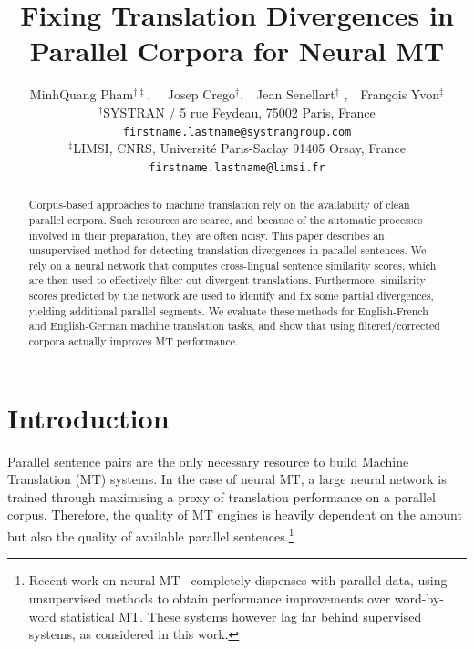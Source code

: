 \documentclass[11pt,a4paper]{article}
\title{Fixing Translation Divergences in Parallel Corpora for Neural MT}
\author{MinhQuang Pham$^{\dag\ddag}$, \ \ Josep Crego$^\dag$,\ \ Jean Senellart$^\dag$ ,\ \ Fran\c cois Yvon$^\ddag$\\
  $^\dag$SYSTRAN / 5 rue Feydeau, 75002 Paris, France\\
  {\tt firstname.lastname@systrangroup.com}\\
  $^\ddag$LIMSI, CNRS,  Universit\'e Paris-Saclay 91405 Orsay, France\\
  {\tt firstname.lastname@limsi.fr}}
\date{}
\begin{document}
\maketitle

\begin{abstract}

Corpus-based approaches to machine translation rely on the availability of clean parallel corpora.
Such resources are scarce, and because of the automatic processes involved in their preparation, they are often noisy. %
This paper describes an unsupervised method for detecting translation divergences in parallel sentences. We rely on a neural network that computes cross-lingual sentence similarity scores, which are then used to effectively filter out divergent translations. Furthermore, similarity scores predicted by the network are used to identify and fix some partial divergences, yielding additional parallel segments. We evaluate these methods for English-French and English-German machine translation tasks,  and show that using filtered/corrected corpora actually improves MT performance.

\end{abstract}

\section{Introduction}

Parallel sentence pairs are the only necessary resource to build Machine Translation (MT) systems. 
In the case of neural MT, a large neural network is trained through maximising a proxy of translation performance on a parallel corpus. 
Therefore, the quality of MT engines is heavily dependent on the amount but also the quality of available parallel sentences.\footnote{Recent work on neural MT~\cite{lample2018word,artetxe2018iclr} completely dispenses with parallel data, using unsupervised methods to obtain performance improvements over word-by-word statistical MT. These systems however lag far behind supervised systems, as considered in this work.} 
\end{document}

